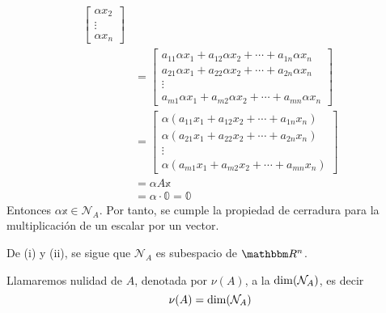\begin{proposition}
\begin{enumerate}[label=\roman*)]
\begin{align*}
\begin{bmatrix}
                \alpha x_2 \\
                \vdots \\
                \alpha x_n
            \end{bmatrix} \\
            & = \begin{bmatrix}
                a_{11}\alpha x_1 + a_{12}\alpha x_2 + \cdots + a_{1n}\alpha x_n \\
                a_{21}\alpha x_1 + a_{22}\alpha x_2 + \cdots + a_{2n}\alpha x_n \\
                \vdots \\
                a_{m1}\alpha x_1 + a_{m2}\alpha x_2 + \cdots + a_{mn}\alpha x_n
            \end{bmatrix} \\
            & = \begin{bmatrix}
                \alpha \left( a_{11}x_1 + a_{12}x_2 + \cdots + a_{1n}x_n \right) \\
                \alpha \left( a_{21}x_1 + a_{22}x_2 + \cdots + a_{2n}x_n \right) \\
                \vdots \\
                \alpha \left( a_{m1}x_1 + a_{m2}x_2 + \cdots + a_{mn}x_n \right)
            \end{bmatrix} \\
            & = \alpha A \mathbb{x} \\
            & = \alpha \cdot \mathbb{0} = \mathbb{0}
        \end{align*}
        Entonces $\alpha \mathbb{x} \in \mathcal{N}_A$. Por tanto, se cumple la propiedad de cerradura para la multiplicación de un escalar por un vector.
    \end{enumerate}
    De (i) y (ii), se sigue que $\mathcal{N}_A$ es subespacio de $\RR[n]$.
\end{proposition}

\begin{definition}
    Llamaremos nulidad de $A$, denotada por $\nu(A)$, a la $\operatorname{dim}(\mathcal{N}_A)$, es decir
    $$\nu(A) = \operatorname{dim}(\mathcal{N}_A)$$
\end{definition}

